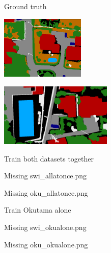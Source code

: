 \begin{figure}[ht!]
  \begin{subfigure}[c]{0.20\textwidth}
    \centering Ground truth
  \end{subfigure}
  \begin{subfigure}[c]{0.33\textwidth}
    \includegraphics[height=3cm]{images/part4/swi_gt.png}
  \end{subfigure}
  \begin{subfigure}[c]{0.45\textwidth}
    \includegraphics[height=3cm]{images/part4/oku_gt.png}
  \end{subfigure}
  \vspace{0.3cm}
  
  \begin{subfigure}[c]{0.20\textwidth}
    \centering Train both datasets together
  \end{subfigure}
  \begin{subfigure}[c]{0.33\textwidth}
    \centering Missing swi\_allatonce.png
  \end{subfigure}
  \begin{subfigure}[c]{0.45\textwidth}
    \centering Missing oku\_allatonce.png
  \end{subfigure}
  \vspace{0.3cm}
  
  \begin{subfigure}[c]{0.20\textwidth}
    \centering Train Okutama alone
  \end{subfigure}
  \begin{subfigure}[c]{0.33\textwidth}
    \centering Missing swi\_okualone.png
  \end{subfigure}
  \begin{subfigure}[c]{0.45\textwidth}
    \centering Missing oku\_okualone.png
  \end{subfigure}
  \vspace{0.1cm}
  

\end{figure}
